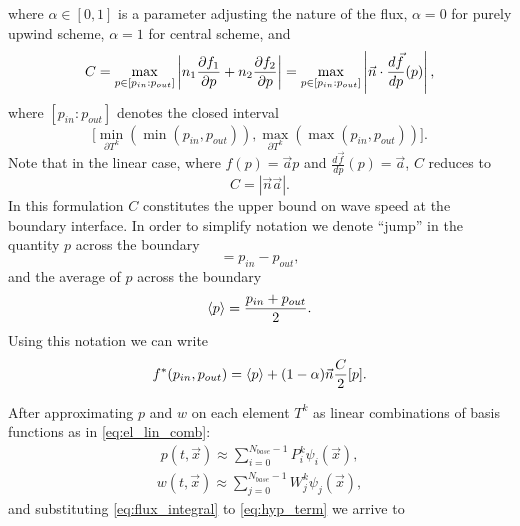 where $\alpha \in [0, 1]$ is a parameter adjusting the nature of the flux, $\alpha = 0$ for
purely upwind scheme,
$\alpha = 1$ for central scheme,  and
\begin{equation}
C = \max_{p \in [p_{in} : p_{out}]} \left\lvert n_1 \frac{\partial f_1}{\partial p} + n_2 \frac{\partial f_2}{\partial p}\right\rvert =
\max_{p \in [p_{in} : p_{out}]} \left\lvert\vec{n}\cdot\frac{d\vec{f}}{dp}(p)\right\rvert,
\end{equation}
where $[p_{in} : p_{out}]$ denotes the closed interval
$$\big[\min_{\partial{T^k}} (\min(p_{in}, p_{out})),
\max_{\partial{T^k}}(\max(p_{in}, p_{out}))\big].$$
Note that in the linear case, where $f(p) = \vec{a}p$ and $\frac{d\vec{f}}{dp}(p) = \vec{a}$, $C$ reduces to
\begin{equation}
C = |\vec{n}\vec{a}|.
\end{equation}
In this formulation $C$ constitutes the upper bound on wave speed at the boundary interface.
In order to simplify notation we denote ``jump'' in
the quantity $p$ across the boundary
\begin{equation}
[p] = p_{in} - p_{out},
\end{equation}
and the average of $p$ across the boundary
\begin{equation}
\label{eq:avrg}
\langle p\rangle = \frac{p_{in}+p_{out}}{2}.
\end{equation}
Using this notation we can write
\begin{equation}
f^*(p_{in}, p_{out}) = \langle p\rangle + (1-\alpha) \vec{n}\frac{C}{2}[p].
\end{equation}

After approximating $p$ and $w$ on each element $T^k$ as linear combinations of
basis functions as in \eqref{eq:el_lin_comb}:
\begin{align}
\label{eq:state_epprox}
p(t, \vec{x}) \approx \sum\limits_{i=0}^{N_{base}-1} P_i^k\psi_i(\vec{x}),
\end{align}
\begin{align}
\label{eq:test_approx}
w(t, \vec{x}) \approx \sum\limits_{j=0}^{N_{base}-1} W_j^k\psi_j(\vec{x}),
\end{align}
and substituting \eqref{eq:flux_integral} to \eqref{eq:hyp_term} we arrive to

